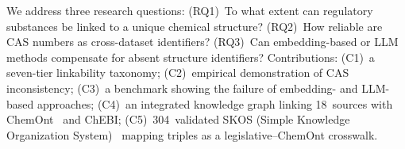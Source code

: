 We address three research questions:
(RQ1)~To what extent can regulatory substances be linked to a unique chemical structure?
(RQ2)~How reliable are CAS numbers as cross-dataset identifiers?
(RQ3)~Can embedding-based or LLM methods compensate for absent structure identifiers?
Contributions: (C1)~a seven-tier linkability taxonomy; (C2)~empirical demonstration of CAS inconsistency; (C3)~a benchmark showing the failure of embedding- and LLM-based approaches; (C4)~an integrated knowledge graph linking 18~sources with ChemOnt~\cite{DjoumbouFeunang2016} and ChEBI; (C5)~304~validated SKOS (Simple Knowledge Organization System)~\cite{W3C2009SKOS} mapping triples as a legislative--ChemOnt crosswalk.
